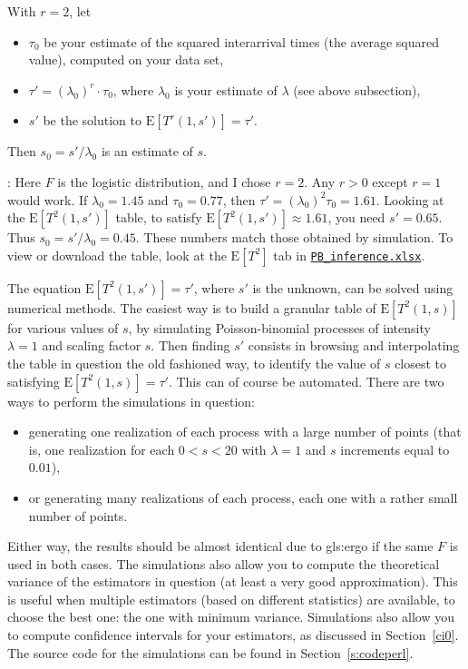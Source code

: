 \documentclass[10pt]{article}
\begin{document}
\noindent With $r=2$, let
\begin{itemize}
\item $\tau_0$ be your estimate of the squared interarrival times (the average squared value), computed on your data set,
\item $\tau'=(\lambda_0)^r \cdot \tau_0$, where $\lambda_0$ is your estimate of $\lambda$ (see above subsection),
\item $s'$ be the solution to $\mbox{E}[T^r(1, s')]=\tau'$.
\end{itemize}
Then $s_0=s'/\lambda_0$ is an estimate of $s$.   

: Here $F$ is the logistic distribution, and I chose $r=2$. Any $r>0$ except $r=1$ would work. If $\lambda_0=1.45$ and $\tau_0=0.77$, then 
$\tau'=(\lambda_0)^2 \tau_0=1.61$. Looking at the $\mbox{E}[T^2(1, s')]$ table, to satisfy $\mbox{E}[T^2(1, s')]\approx 1.61$, you need $s'=0.65$. Thus $s_0=s'/\lambda_0 = 0.45$. These numbers match those obtained by simulation. 
To view or download the table, look at the $\mbox{E}[T^2]$ tab in \href{https://github.com/VincentGranville/Point-Processes/tree/main/Spreadsheets}{ \texttt{PB\_inference.xlsx}}. 

The equation  $\mbox{E}[T^2(1, s')]=\tau'$, where $s'$ is the unknown, can be solved using numerical methods. The easiest way is to build 
a granular table of $\mbox{E}[T^2(1, s)]$ for various values of $s$, by simulating Poisson-binomial processes of
intensity $\lambda=1$ and scaling factor $s$. Then finding $s'$ consists in browsing and interpolating the table in question the old fashioned way, to identify the value of $s$ closest to satisfying $\mbox{E}[T^2(1, s)]=\tau'$. This can of course be automated. There are two ways to perform the simulations in question: 
\begin{itemize}
\item generating one realization of each process with a large number of points (that is, one realization for each $0<s<20$ with $\lambda=1$ and $s$ increments equal to $0.01$),  
\item or generating many realizations of each process, each one with a rather small number of points. 
\end{itemize}
Either way, the results should be almost identical due to \gls{gls:ergo} if the same $F$ is used in both cases. The simulations also allow you to compute the theoretical variance of the estimators in question (at least a very good approximation). This is useful when multiple estimators (based on different statistics) are available, to choose the best one: the one with minimum  variance. Simulations also allow you to compute \textcolor{index}{confidence intervals} for your estimators, as discussed in Section~\ref{ci0}. The source code for the simulations can be found in Section~\ref{s:codeperl}. \\
\end{document}
